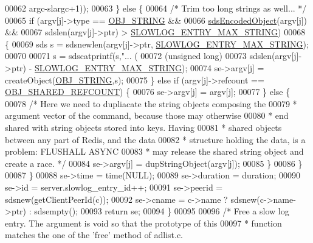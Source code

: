 \begin{DoxyCode}
{00062                 argc-slargc+1));
00063         \} \textcolor{keywordflow}{else} \{
00064             \textcolor{comment}{/* Trim too long strings as well... */}
00065             \textcolor{keywordflow}{if} (argv[j]->type == \hyperlink{server_8h_a65236ea160f69cdef33ec942092af88f}{OBJ\_STRING} &&
00066                 \hyperlink{server_8h_afcfb5bd97af52d1dbce331745cae030c}{sdsEncodedObject}(argv[j]) &&
00067                 sdslen(argv[j]->ptr) > \hyperlink{slowlog_8h_a2b240c1b44f90bb05f0902c94a6a9b57}{SLOWLOG\_ENTRY\_MAX\_STRING})
00068             \{
00069                 sds s = sdsnewlen(argv[j]->ptr, \hyperlink{slowlog_8h_a2b240c1b44f90bb05f0902c94a6a9b57}{SLOWLOG\_ENTRY\_MAX\_STRING});
00070 
00071                 s = sdscatprintf(s,\textcolor{stringliteral}{"... (%
00072                     (\textcolor{keywordtype}{unsigned} \textcolor{keywordtype}{long})
00073                     sdslen(argv[j]->ptr) - \hyperlink{slowlog_8h_a2b240c1b44f90bb05f0902c94a6a9b57}{SLOWLOG\_ENTRY\_MAX\_STRING});
00074                 se->argv[j] = createObject(\hyperlink{server_8h_a65236ea160f69cdef33ec942092af88f}{OBJ\_STRING},s);
00075             \} \textcolor{keywordflow}{else} \textcolor{keywordflow}{if} (argv[j]->refcount == \hyperlink{server_8h_a1dc2a137875b0c8ee0fa1df43684a7b8}{OBJ\_SHARED\_REFCOUNT}) \{
00076                 se->argv[j] = argv[j];
00077             \} \textcolor{keywordflow}{else} \{
00078                 \textcolor{comment}{/* Here we need to dupliacate the string objects composing the}
00079 \textcolor{comment}{                 * argument vector of the command, because those may otherwise}
00080 \textcolor{comment}{                 * end shared with string objects stored into keys. Having}
00081 \textcolor{comment}{                 * shared objects between any part of Redis, and the data}
00082 \textcolor{comment}{                 * structure holding the data, is a problem: FLUSHALL ASYNC}
00083 \textcolor{comment}{                 * may release the shared string object and create a race. */}
00084                 se->argv[j] = dupStringObject(argv[j]);
00085             \}
00086         \}
00087     \}
00088     se->time = time(NULL);
00089     se->duration = duration;
00090     se->id = server.slowlog\_entry\_id++;
00091     se->peerid = sdsnew(getClientPeerId(c));
00092     se->cname = c->name ? sdsnew(c->name->ptr) : sdsempty();
00093     \textcolor{keywordflow}{return} se;
00094 \}
00095 
00096 \textcolor{comment}{/* Free a slow log entry. The argument is void so that the prototype of this}
00097 \textcolor{comment}{ * function matches the one of the 'free' method of adlist.c.}
}}
\end{DoxyCode}
